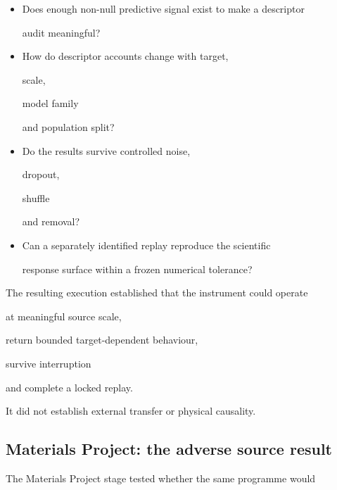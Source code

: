 \documentclass[11pt,a4paper,oneside]{report}
\begin{document}
\begin{itemize}



\item

Does enough non-null predictive signal exist to make a descriptor

audit meaningful?



\item

How do descriptor accounts change with target,

scale,

model family

and population split?



\item

Do the results survive controlled noise,

dropout,

shuffle

and removal?



\item

Can a separately identified replay reproduce the scientific

response surface within a frozen numerical tolerance?



\end{itemize}



The resulting execution established that the instrument could operate

at meaningful source scale,

return bounded target-dependent behaviour,

survive interruption

and complete a locked replay.



It did not establish external transfer or physical causality.



\subsection{Materials Project: the adverse source result}



The Materials Project stage tested whether the same programme would
\end{document}

